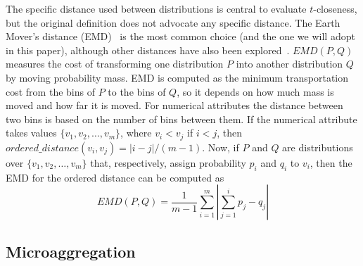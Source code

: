 \documentclass[10pt,journal,compsoc]{IEEEtran}
\theoremstyle{definition}
\theoremstyle{plain}
\begin{document}
The specific distance used between distributions is central to evaluate 
$t$-closeness, but the original definition does not advocate any specific
distance. The Earth Mover's distance (EMD)~\cite{Rubner2000Earth} 
is the most common choice (and the one we will adopt in this paper),
although other distances have also been 
explored~\cite{Rebollo,Soria2013differential,DomingoSoria15}.
$EMD(P,Q)$ measures the cost of transforming one distribution $P$ 
into another distribution $Q$ by moving probability mass.
EMD is computed as the minimum transportation
cost from the bins of $P$ to the bins of $Q$, so it 
depends on how much mass is moved and how far it is moved.
For numerical attributes the distance between two bins is
based on the number of bins between them. If the numerical
attribute takes values $\{v_1,v_2,\ldots,v_m\}$, where $v_i<v_j$
if $i<j$, then $ordered\_distance(v_i,v_j)=|i-j|/(m-1)$. 
Now, if $P$ and $Q$ are distributions over $\{v_1,v_2,\ldots,v_m\}$
that, respectively, assign probability $p_i$ and $q_i$ to $v_i$,
then the EMD for the ordered distance can be computed as
\[EMD(P,Q) = \frac{1}{m-1} \sum_{i=1}^{m} \left| \sum_{j=1}^{i} p_j-q_j \right|\]








\subsection{Microaggregation}
\label{micro}
\end{document}
